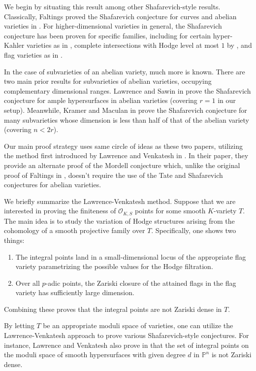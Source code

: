 \documentclass{article}
\theoremstyle{definition}
\theoremstyle{remark}
\begin{document}
We begin by situating this result among other Shafarevich-style results. Classically, Faltings proved the Shafarevich conjecture for curves and abelian varieties in \cite{faltings}. For higher-dimensional varieties in general, the Shafarevich conjecture has been proven for specific families, including for certain hyper-Kahler varieties as in \cite{andreK3}, complete intersections with Hodge level at most $1$ by \cite{JavanLoughranLowHodge}, and flag varieties as in \cite{JLflag}.
\par In the case of subvarieties of an abelian variety, much more is known. There are two main prior results for subvarieties of abelian varieties, occupying complementary dimensional ranges. Lawrence and Sawin in \cite{ls25} prove the Shafarevich conjecture for ample hypersurfaces in abelian varieties (covering $r = 1$ in our setup). Meanwhile, Kramer and Maculan in \cite{km24} prove the Shafarevich conjecture for many subvarieties whose dimension is less than half of that of the abelian variety (covering $n < 2r$).
\par Our main proof strategy uses same circle of ideas as these two papers, utilizing the method first introduced by Lawrence and Venkatesh in \cite{lv18}. In their paper, they provide an alternate proof of the Mordell conjecture which, unlike the original proof of Faltings in \cite{faltings}, doesn't require the use of the Tate and Shafarevich conjectures for abelian varieties. 
\par We briefly summarize the Lawrence-Venkatesh method. Suppose that we are interested in proving the finiteness of $\mathcal{O}_{K, S}$ points for some smooth $K$-variety $T.$ The main idea is to study the variation of Hodge structures arising from the cohomology of a smooth projective family over $T.$ Specifically, one shows two things:
\begin{enumerate}
    \item The integral points land in a small-dimensional locus of the appropriate flag variety parametrizing the possible values for the Hodge filtration. 
    \item Over all $p$-adic points, the Zariski closure of the attained flags in the flag variety has sufficiently large dimension. 
\end{enumerate}
Combining these proves that the integral points are not Zariski dense in $T.$ 
\par By letting $T$ be an appropriate moduli space of varieties, one can utilize the Lawrence-Venkatesh approach to prove various Shafarevich-style conjectures. For instance, Lawrence and Venkatesh also prove in \cite{lv18} that the set of integral points on the moduli space of smooth hypersurfaces with given degree $d$ in $\mathbb{P}^n$ is not Zariski dense.
\end{document}
